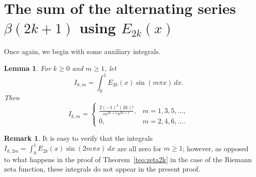 \documentclass[11pt, oneside]{article}
\theoremstyle{plain}
\newtheorem{lemma}[theorem]{Lemma}
\theoremstyle{definition}
\newtheorem{remark}[theorem]{Remark}
\begin{document}
\section{The sum of the alternating series $\beta(2k+1)$ using $E_{2k}(x)$}
\label{sec:sumE}

Once again, we begin with some auxiliary integrals.

\begin{lemma}
\label{lem:IkmEuler}
For $k \ge 0$ and $m \ge 1$, let
\[
  I_{k,m} = \int_0^{1} E_{2k}(x) \sin(m\pi x)\,dx.
\]
Then
\begin{equation}
\label{eq:evalIntEuler}
  I_{k,m} = 
  \begin{cases}
  \displaystyle \frac{2(-1)^{k}(2k)!}{m^{2k+1} \pi^{2k+1}}, & m=1,3,5,\dots, \\
  0, & m=2,4,6,\dots. 
  \end{cases}
\end{equation}
\end{lemma}

\begin{remark}
It is easy to verify that the integrals $I_{k,2m} = \int_0^{1} E_{2k}(x) \sin(2m\pi x)\,dx$ are all zero for $m \ge 1$; however, as opposed to what happens in the proof of Theorem~\ref{teo:zeta2k} in the case of the Riemann zeta function, these integrals do not appear in the present proof. 
\end{remark}
\end{document}
